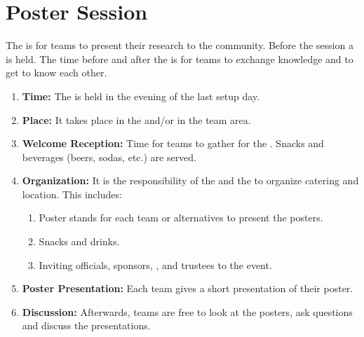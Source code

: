 \section{Poster Session}
\label{sec:setupdays:postersession}
The \PS{} is for teams to present their research to the \AtHome{} community. Before the session a \WelcomeReception{} is held. The time before and after the \PS{} is for teams to exchange knowledge and to get to know each other.
\begin{enumerate}
	\item \textbf{Time:} The \PS{} is held in the evening of the last setup day.
	\item \textbf{Place:} It takes place in the \Arena{} and/or in the team area.
	\item \textbf{Welcome Reception:} Time for teams to gather for the \PS{}. Snacks and beverages (beers, sodas, etc.) are served.
	\item \textbf{Organization:} It is the responsibility of the  and the  to organize catering and location. This includes:
		\begin{enumerate}
			\item Poster stands for each team or alternatives to present the posters.
			\item Snacks and drinks.
			\item Inviting officials, sponsors, , and \RCF{} trustees to the event.
		\end{enumerate}
	\item \textbf{Poster Presentation:} Each team gives a short presentation of their poster.
	\item \textbf{Discussion:} Afterwards, teams are free to look at the posters, ask questions and discuss the presentations.
\end{enumerate}

